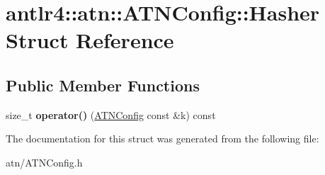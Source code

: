 \hypertarget{structantlr4_1_1atn_1_1ATNConfig_1_1Hasher}{}\section{antlr4\+:\+:atn\+:\+:A\+T\+N\+Config\+:\+:Hasher Struct Reference}
\label{structantlr4_1_1atn_1_1ATNConfig_1_1Hasher}
\subsection*{Public Member Functions}
\begin{DoxyCompactItemize}
\item 
\mbox{\label{structantlr4_1_1atn_1_1ATNConfig_1_1Hasher_a2191f995ae4700d00c26c996a13ff578}} 
size\+\_\+t {\bfseries operator()} (\hyperlink{classantlr4_1_1atn_1_1ATNConfig}{A\+T\+N\+Config} const \&k) const
\end{DoxyCompactItemize}


The documentation for this struct was generated from the following file\+:\begin{DoxyCompactItemize}
\item 
atn/A\+T\+N\+Config.\+h\end{DoxyCompactItemize}

